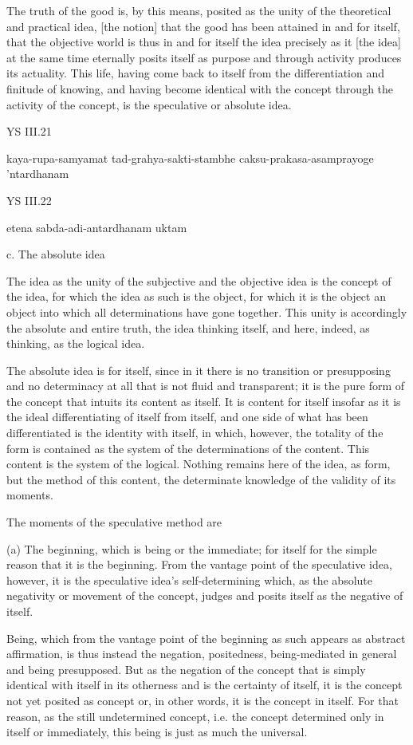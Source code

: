 The truth of the good is, by this means, posited as
the unity of the theoretical and practical idea,
[the notion] that the good has been attained in and for itself,
that the objective world is thus in and for itself the idea precisely as
it [the idea] at the same time eternally posits itself as purpose and
through activity produces its actuality.
This life, having come back to itself from
the differentiation and finitude of knowing,
and having become identical with the concept
through the activity of the concept,
is the speculative or absolute idea.

YS III.21

kaya-rupa-samyamat tad-grahya-sakti-stambhe
caksu-prakasa-asamprayoge 'ntardhanam

YS III.22

etena sabda-adi-antardhanam uktam

c. The absolute idea

The idea as the unity of
the subjective and the objective idea is
the concept of the idea,
for which the idea as such is the object,
for which it is the object
an object into which
all determinations have gone together.
This unity is accordingly
the absolute and entire truth,
the idea thinking itself,
and here, indeed, as thinking,
as the logical idea.

The absolute idea is for itself,
since in it there is no transition or presupposing
and no determinacy at all that is not fluid and transparent;
it is the pure form of the concept
that intuits its content as itself.
It is content for itself
insofar as it is the ideal differentiating of
itself from itself,
and one side of what has been differentiated is
the identity with itself,
in which, however, the totality of the form is
contained as the system of the determinations of the content.
This content is the system of the logical.
Nothing remains here of the idea, as form,
but the method of this content,
the determinate knowledge of the validity of its moments.

The moments of the speculative method are

(a) The beginning, which is being or the immediate;
for itself for the simple reason that it is the beginning.
From the vantage point of the speculative idea, however,
it is the speculative idea's self-determining which,
as the absolute negativity or movement of the concept,
judges and posits itself as the negative of itself.

Being, which from the vantage point of the beginning as such
appears as abstract affirmation, is thus instead the negation,
positedness, being-mediated in general and being presupposed.
But as the negation of the concept that is
simply identical with itself in its otherness
and is the certainty of itself,
it is the concept not yet posited as concept
or, in other words,
it is the concept in itself.
For that reason, as the still undetermined concept,
i.e. the concept determined only in itself or immediately,
this being is just as much the universal.

